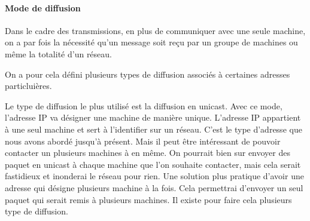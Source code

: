 \paragraph{Mode de diffusion}
Dans le cadre des transmissions, en plus de communiquer avec une seule machine, on
a par fois la nécessité qu'un message soit reçu par un groupe de machines ou
même la totalité d'un réseau.

On a pour cela défini plusieurs types de diffusion associés à certaines adresses particluières.

Le type de diffusion le plus utilisé est la diffusion en unicast. Avec ce mode,
l'adresse IP va désigner une machine de manière unique. L'adresse IP appartient
à une seul machine et sert à l'identifier sur un réseau.  C'est le type
d'adresse que nous avons abordé jusqu'à présent.  Mais il peut être intéressant
de pouvoir contacter un plusieurs machines à en même. On pourrait bien sur
envoyer des paquet en unicast à chaque machine que l'on souhaite contacter,
mais cela serait fastidieux et inonderai le réseau pour rien. Une solution plus
pratique d'avoir une adresse qui désigne plusieurs machine à la fois. Cela
permettrai d'envoyer un seul paquet qui serait remis à plusieurs machines. Il
existe pour faire cela plusieurs type de diffusion.
